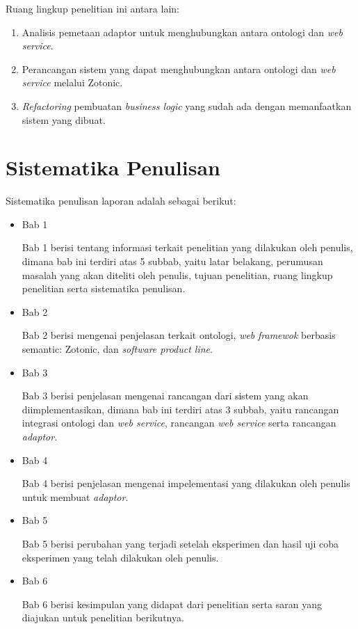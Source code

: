 Ruang lingkup penelitian ini antara lain:
\begin{enumerate}
\item Analisis pemetaan adaptor untuk menghubungkan antara ontologi dan \textit{web service}.
\item Perancangan sistem yang dapat menghubungkan antara ontologi dan \textit{web service} melalui Zotonic.
\item \textit{Refactoring} pembuatan \textit{business logic} yang sudah ada dengan memanfaatkan sistem yang dibuat.
\end{enumerate}

\section{Sistematika Penulisan}
Sistematika penulisan laporan adalah sebagai berikut:
\begin{itemize}
	\item Bab 1 \babSatu
	
	Bab 1 berisi tentang informasi terkait penelitian yang dilakukan oleh penulis, dimana bab ini terdiri atas 5 subbab, yaitu latar belakang, perumusan masalah yang akan diteliti oleh penulis, tujuan penelitian, ruang lingkup penelitian serta sistematika penulisan.\\
	\item Bab 2 \babDua
	
	Bab 2 berisi mengenai penjelasan terkait ontologi, \textit{web} \textit{framewok} berbasis semantic: Zotonic, dan \textit{software product line}.\\
	\item Bab 3 \babTiga 
	
	Bab 3 berisi penjelasan mengenai rancangan dari sistem yang akan diimplementasikan, dimana bab ini terdiri atas 3 subbab, yaitu rancangan integrasi ontologi dan \textit{web service}, rancangan \textit{web service} serta rancangan \textit{adaptor}.\\
	
	\item Bab 4 \babEmpat
	
	Bab 4 berisi penjelasan mengenai impelementasi yang dilakukan oleh penulis untuk membuat \textit{adaptor}. \\
	
	\item Bab 5 \babLima	
	
	Bab 5 berisi perubahan yang terjadi setelah eksperimen dan hasil uji coba eksperimen yang telah dilakukan oleh penulis. \\
	
	\item Bab 6 \babEnam
	
	Bab 6 berisi kesimpulan yang didapat dari penelitian serta saran yang diajukan untuk penelitian berikutnya.
\end{itemize}